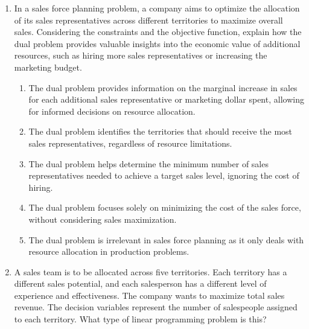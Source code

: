 \documentclass{article}%
\begin{document}
\begin{enumerate}
\begin{enumerate}
\item The reduced cost indicates the marginal increase in total sales revenue if a sales representative were assigned to that territory.%
\item The reduced cost indicates the decrease in total sales revenue if a sales representative were assigned to that territory.%
\item The reduced cost indicates the marginal cost of assigning a sales representative to that territory.%
\end{enumerate}%
\vspace{1em}%
\item In a sales force planning problem, a company aims to optimize the allocation of its sales representatives across different territories to maximize overall sales.  Considering the constraints and the objective function, explain how the dual problem provides valuable insights into the economic value of additional resources, such as hiring more sales representatives or increasing the marketing budget.%
\begin{enumerate}%
\item The dual problem provides information on the marginal increase in sales for each additional sales representative or marketing dollar spent, allowing for informed decisions on resource allocation.%
\item The dual problem identifies the territories that should receive the most sales representatives, regardless of resource limitations.%
\item The dual problem helps determine the minimum number of sales representatives needed to achieve a target sales level, ignoring the cost of hiring.%
\item The dual problem focuses solely on minimizing the cost of the sales force, without considering sales maximization.%
\item The dual problem is irrelevant in sales force planning as it only deals with resource allocation in production problems.%
\end{enumerate}%
\vspace{1em}%
\item A sales team is to be allocated across five territories. Each territory has a different sales potential, and each salesperson has a different level of experience and effectiveness. The company wants to maximize total sales revenue.  The decision variables represent the number of salespeople assigned to each territory. What type of linear programming problem is this?%
\begin{enumerate}%

\end{enumerate}
\end{enumerate}
\end{document}
